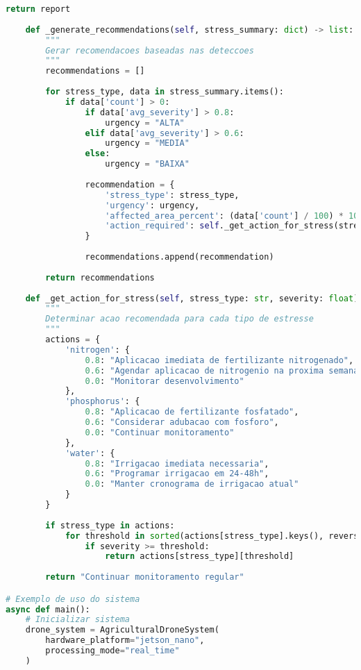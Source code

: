 \begin{lstlisting}[language=Python]
        return report
    
    def _generate_recommendations(self, stress_summary: dict) -> list:
        """
        Gerar recomendacoes baseadas nas deteccoes
        """
        recommendations = []
        
        for stress_type, data in stress_summary.items():
            if data['count'] > 0:
                if data['avg_severity'] > 0.8:
                    urgency = "ALTA"
                elif data['avg_severity'] > 0.6:
                    urgency = "MEDIA"
                else:
                    urgency = "BAIXA"
                
                recommendation = {
                    'stress_type': stress_type,
                    'urgency': urgency,
                    'affected_area_percent': (data['count'] / 100) * 100,  # Aproximacao
                    'action_required': self._get_action_for_stress(stress_type, data['avg_severity'])
                }
                
                recommendations.append(recommendation)
        
        return recommendations
    
    def _get_action_for_stress(self, stress_type: str, severity: float) -> str:
        """
        Determinar acao recomendada para cada tipo de estresse
        """
        actions = {
            'nitrogen': {
                0.8: "Aplicacao imediata de fertilizante nitrogenado",
                0.6: "Agendar aplicacao de nitrogenio na proxima semana",
                0.0: "Monitorar desenvolvimento"
            },
            'phosphorus': {
                0.8: "Aplicacao de fertilizante fosfatado",
                0.6: "Considerar adubacao com fosforo",
                0.0: "Continuar monitoramento"
            },
            'water': {
                0.8: "Irrigacao imediata necessaria",
                0.6: "Programar irrigacao em 24-48h",
                0.0: "Manter cronograma de irrigacao atual"
            }
        }
        
        if stress_type in actions:
            for threshold in sorted(actions[stress_type].keys(), reverse=True):
                if severity >= threshold:
                    return actions[stress_type][threshold]
        
        return "Continuar monitoramento regular"

# Exemplo de uso do sistema
async def main():
    # Inicializar sistema
    drone_system = AgriculturalDroneSystem(
        hardware_platform="jetson_nano",
        processing_mode="real_time"
    )
    

\end{lstlisting}
